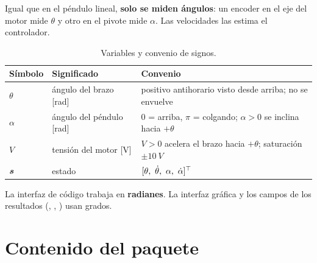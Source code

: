 Igual que en el péndulo lineal, \textbf{solo se miden ángulos}: un encoder en el eje del motor mide $\theta$ y otro en el pivote mide $\alpha$. Las velocidades las estima el controlador.

\begin{table}[H]
\centering\small
\begin{tabular}{@{}lll@{}}
\toprule
Símbolo & Significado & Convenio\\
\midrule
$\theta$ & ángulo del brazo [rad] & positivo antihorario visto desde arriba; no se envuelve\\
$\alpha$ & ángulo del péndulo [rad] & $0$ = arriba, $\pi$ = colgando; $\alpha>0$ se inclina hacia $+\theta$\\
$V$ & tensión del motor [V] & $V>0$ acelera el brazo hacia $+\theta$; saturación $\pm\SI{10}{V}$\\
$\bm{s}$ & estado & $[\theta,\ \thd,\ \alpha,\ \ald]^\top$\\
\bottomrule
\end{tabular}
\caption{Variables y convenio de signos.}
\label{tab:convenio}
\end{table}

\begin{nota}
La interfaz de código trabaja en \textbf{radianes}. La interfaz gráfica y los campos  de los resultados (, , ) usan grados.
\end{nota}

\section{Contenido del paquete}

